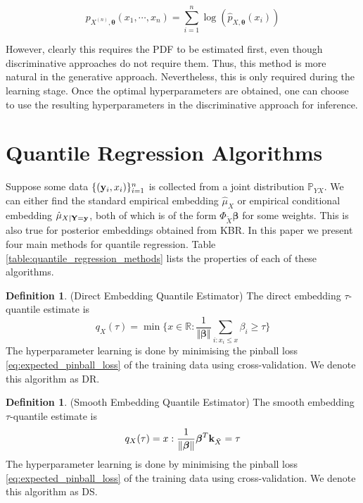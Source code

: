 \documentclass[twoside]{article} \usepackage{aistats2017}
\theoremstyle{definition}
\newtheorem{definition}[theorem]{Definition}
\newcommand{\rv}[1]{{#1}}
\newcommand{\ds}[1]{\tilde{#1}}
\begin{document}
	\begin{equation}
		p_{\rv{X}^{(n)}, \bm{\theta}}(x_{1}, \cdots, x_{n}) = \sum_{i = 1}^{n} \log(\hat{p}_{\rv{X}, \bm{\theta}}(x_{i}))
	\label{eq:lml}
	\end{equation}
	
	However, clearly this requires the PDF to be estimated first, even though discriminative approaches do not require them. Thus, this method is more natural in the generative approach. Nevertheless, this is only required during the learning stage. Once the optimal hyperparameters are obtained, one can choose to use the resulting hyperparameters in the discriminative approach for inference.
	
\section{Quantile Regression Algorithms}
\label{sec:quantile_regression_algorithms}
	
	Suppose some data $\{(\mathbf{y}_{i}, x_{i})\}_{i = 1}^{n}$ is collected from a joint distribution $\mathbb{P}_{\rv{Y} \rv{X}}$. We can either find the standard empirical embedding $\hat{\mu}_{\rv{X}}$ or empirical conditional embedding $\hat{\mu}_{\rv{X} | \bvec{\rv{Y}} = \bvec{y}}$, both of which is of the form $\Phi_{\ds{X}} \bm{\beta}$ for some weights. This is also true for posterior embeddings obtained from KBR. In this paper we present four main methods for quantile regression. 	Table \ref{table:quantile_regression_methods} lists the properties of each of these algorithms.

	\theoremstyle{definition}
	\begin{definition}
		(Direct Embedding Quantile Estimator)
		The direct embedding $\tau$-quantile estimate is
		\begin{equation}
			q_{\rv{X}}(\tau) = \min\{x \in \mathbb{R} : \frac{1}{\Vert \bm{\beta} \Vert} \sum_{i : x_{i} \leq x} \beta_{i} \geq \tau\}
		\end{equation}	
		The hyperparameter learning is done by minimising the pinball loss \eqref{eq:expected_pinball_loss} of the training data using cross-validation. We denote this algorithm as DR.
	\end{definition}
	
	\theoremstyle{definition}
	\begin{definition}
		(Smooth Embedding Quantile Estimator)
		The smooth embedding $\tau$-quantile estimate is
		\begin{equation}
			q_{\rv{X}}(\tau) = x : \frac{1}{\Vert \bm{\beta} \Vert} \bm{\beta}^{T} \bvec{k}_{\ds{X}} = \tau
		\end{equation}	
		The hyperparameter learning is done by minimising the pinball loss \eqref{eq:expected_pinball_loss} of the training data using cross-validation. We denote this algorithm as DS.
	\end{definition}
	
\end{document}

